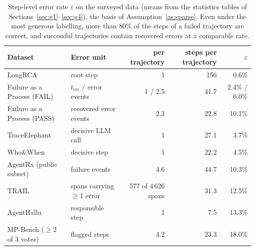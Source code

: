 \begin{table}[h]\centering\small
\begin{tabular}{@{}llrrr@{}}\toprule
Dataset & Error unit & per trajectory & steps per trajectory & $\varepsilon$ \\\midrule
LongRCA & root step & 1 & 156 & 0.6\% \\
Failure as a Process (FAIL) & $t_{\mathrm{err}}$ / error events & 1 / 2.5 & 41.7 & 2.4\% / 6.0\% \\
Failure as a Process (PASS) & recovered error events & 2.3 & 22.8 & 10.1\% \\
TraceElephant & decisive LLM call & 1 & 27.1 & 3.7\% \\
Who\&When & decisive step & 1 & 22.2 & 4.5\% \\
AgentRx (public subset) & failure events & 4.6 & 44.7 & 10.3\% \\
TRAIL & spans carrying $\ge$1 error & 577 of 4\,626 spans & 31.3 & 12.5\% \\
AgentHallu & responsible step & 1 & 7.5 & 13.3\% \\
MP-Bench ($\ge$2 of 3 votes) & flagged steps & 4.2 & 23.3 & 18.0\% \\\bottomrule
\end{tabular}
\caption{Step-level error rate $\varepsilon$ on the surveyed data (means from the statistics tables of Sections~\ref{sec:g1}--\ref{sec:g4}), the basis of Assumption~\ref{as:sparse}. Even under the most generous labelling, more than 80\% of the steps of a failed trajectory are correct, and successful trajectories contain recovered errors at a comparable rate.}
\label{tab:contam}
\end{table}

